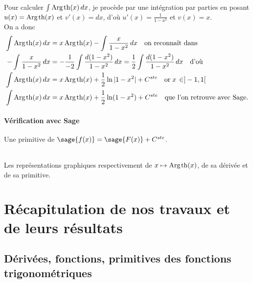 \documentclass[a4paper,landscape,17pt]{extreport} %
\renewcommand{\tanh}{\mathop{\mathrm{th}}}
\renewcommand{\arg}{\mathop{\mathrm{Arg}}}
\begin{document}
Pour calculer $\int \arg\mspace{-1mu}\tanh(x) \, dx$, je procède par une intégration par parties en posant $u(x) = \arg\mspace{-1mu}\tanh(x)$ et $v'(x) = dx$, d'où $u'(x) = \frac{1}{ 1 - x^2 }$ et $ v(x) = x $. \\
On a donc
\begin{align*}
\int \arg\mspace{-1mu}\tanh(x) \, dx & = x \arg\mspace{-1mu}\tanh(x) - \int  \frac{x}{ 1 - x^2 } \, dx \quad \textrm{on reconnaît dans}\\
- \int  \frac{x}{ 1 - x^2 } \, dx & = -\frac{1}{-2} \int  \frac{d(1 - x^2 )}{ 1 - x^2 } \, dx = \frac{1}{2} \int  \frac{d(1 - x^2 )}{ 1 - x^2 } \, dx  \quad \textrm{d'où}\\
\int \arg\mspace{-1mu}\tanh(x) \, dx & = x \arg\mspace{-1mu}\tanh(x) + \frac{1}{2} \ln|1- x^2| + C^{ste} \quad \textrm{or} \; x \, \in ]-1, 1[ \\
\int \arg\mspace{-1mu}\tanh(x) \, dx & = x \arg\mspace{-1mu}\tanh(x) + \frac{1}{2} \ln(1- x^2) + C^{ste} \quad \textrm{que l'on retrouve avec Sage.}
\end{align*}


\subsubsection{Vérification avec Sage}

Une primitive de $\sage{f(x)} = \sage{F(x)} + C^{ste} $.

\begin{center}
\\
Les représentations graphiques respectivement de $x \mapsto \arg\mspace{-1mu}\tanh(x)$, de sa dérivée et de sa primitive.
\end{center}


\chapter{Récapitulation de nos travaux et de leurs résultats}

\section{Dérivées, fonctions, primitives des fonctions trigonométriques}
\end{document}
